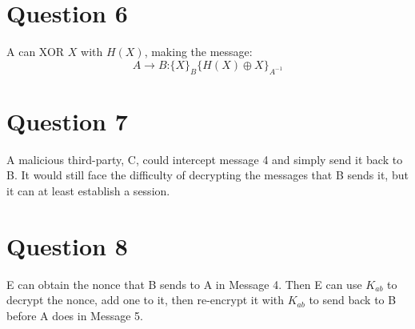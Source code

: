\documentclass[a4paper]{article}
\begin{document}
\section{Question 6}
A can XOR $X$ with $H(X)$, making the message:
$$
A \longrightarrow B \text{:} \{X\}_B \{ H(X) \oplus X \}_{A^{-1}}
$$

\section{Question 7}
A malicious third-party, C, could intercept message 4 and simply send it back to B. It would still face the difficulty of decrypting the messages that B sends it, but it can at least establish a session.

\section{Question 8}
E can obtain the nonce that B sends to A in Message 4. Then E can use $K_{ab}$ to decrypt the nonce, add one to it, then re-encrypt it with $K_{ab}$ to send back to B before A does in Message 5.
\end{document}
